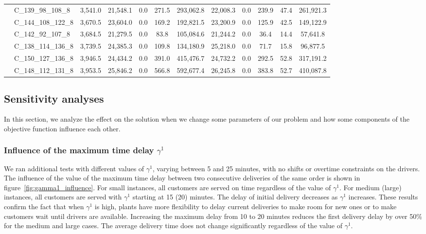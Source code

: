 \begin{table}[!ht]
{\begin{tabular}{llcccccccccc}
     & C\_139\_98\_108\_8 & 3,541.0 & 21,548.1 & 0.0 & 271.5 & 293,062.8 & 22,008.3 & 0.0 & 239.9 & 47.4 & 261,921.3 \\
     & C\_144\_108\_122\_8 & 3,670.5 & 23,604.0 & 0.0 & 169.2 & 192,821.5 & 23,200.9 & 0.0 & 125.9 & 42.5 & 149,122.9 \\
     & C\_142\_92\_107\_8 & 3,684.5 & 21,279.5 & 0.0 & 83.8 & 105,084.6 & 21,244.2 & 0.0 & 36.4 & 14.4 & 57,641.8 \\
     & C\_138\_114\_136\_8 & 3,739.5 & 24,385.3 & 0.0 & 109.8 & 134,180.9 & 25,218.0 & 0.0 & 71.7 & 15.8 & 96,877.5 \\
     & C\_150\_127\_136\_8 & 3,946.5 & 24,434.2 & 0.0 & 391.0 & 415,476.7 & 24,732.2 & 0.0 & 292.5 & 52.8 & 317,191.2 \\
     & C\_148\_112\_131\_8 & 3,953.5 & 25,846.2 & 0.0 & 566.8 & 592,677.4 & 26,245.8 & 0.0 & 383.8 & 52.7 & 410,087.8 \\
    \bottomrule
    \end{tabular}
    }
\end{table}
    
\subsection{Sensitivity analyses}

In this section, we analyze the effect on the solution when we change some parameters of our problem and how some components of the objective function influence each other.

\subsubsection{Influence of the maximum time delay $\gamma^1$}

We ran additional tests with different values of $\gamma^1$, varying between 5 and 25 minutes, with no shifts or overtime constraints on the drivers. The influence of the value of the maximum time delay between two consecutive deliveries of the same order is shown in figure~\ref{fig:gamma1_influence}. For small instances, all customers are served on time regardless of the value of $\gamma^1$. For medium (large) instances, all customers are served with $\gamma^1$ starting at 15 (20) minutes. The delay of initial delivery decreases as $\gamma^1$ increases. These results confirm the fact that when $\gamma^1$ is high, plants have more flexibility to delay current deliveries to make room for new ones or to make customers wait until drivers are available. Increasing the maximum delay from 10 to 20 minutes reduces the first delivery delay by over 50\% for the medium and large cases. The average delivery time does not change significantly regardless of the value of $\gamma^1$.

